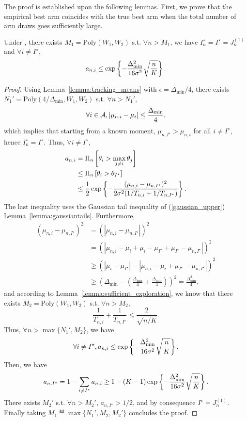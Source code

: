 The proof is established upon the following lemmas. First, we prove that the empirical best arm coincides with the true best arm when the total number of arm draws goes sufficiently large.

\begin{lemma}\label{lemma:empirical_best}
    Under \TTTS, there exists $M_1 = \text{Poly}(W_1,W_2)$ s.t. $\forall n > M_1$, we have $I_n^\star = I^\star = J_n^{(1)}$ and $\forall i \neq I^\star$,
    \[
        a_{n,i} \leq \exp\left\{-\frac{\Delta_{\text{min}}^2}{16\sigma^2}\sqrt{\frac{n}{K}}\right\}.
    \]
\end{lemma}

\begin{proof}
    Using Lemma~\ref{lemma:tracking_means} with $\epsilon = \Delta_{\min}/4$, there exists $N_1' = \text{Poly}(4/\Delta_{\min},W_1,W_2)$ s.t. $\forall n > N_1'$,
    \[
        \forall i\in\mathcal{A}, |\mu_{n,i} - \mu_i| \leq \frac{\Delta_{\min}}{4}, 
    \]
    which implies that starting from a known moment, $\mu_{n,I^\star} > \mu_{n,i}$ for all $i\neq I^\star$, hence $I_n^\star = I^\star$. Thus, $\forall i \neq I^\star$,
    \begin{align*}
        a_{n,i} &= \Pi_{n}\left[\theta_i > \max_{j\neq i} \theta_j\right]\\
                             &\leq \Pi_{n}\left[\theta_i > \theta_{I^\star}\right]\\
                             &\leq \frac{1}{2}\exp\left\{-\frac{(\mu_{n,i}-\mu_{n,I^\star})^2}{2\sigma^2(1/T_{n,i}+1/T_{n,I^\star})}\right\}.
    \end{align*}
    The last inequality uses the Gaussian tail inequality of (\ref{gaussian_upper}) Lemma~\ref{lemma:gaussiantails}. Furthermore,
    \begin{align*}
        (\mu_{n,i} - \mu_{n,I^\star})^2 &= (|\mu_{n,i} - \mu_{n,I^\star}|)^2\\
                                        &= (|\mu_{n,i} - \mu_i + \mu_i - \mu_{I^\star} + \mu_{I^\star} -\mu_{n,I^\star}|)^2\\
                                        &\geq (|\mu_i - \mu_{I^\star}| - |\mu_{n,i} - \mu_i + \mu_{I^\star} -\mu_{n,I^\star}|)^2\\
                                        &\geq \left(\Delta_{\text{min}} - \left(\frac{\Delta_{\text{min}}}{4} + \frac{\Delta_{\text{min}}}{4}\right)\right)^2 = \frac{\Delta_{\text{min}}^2}{4},
    \end{align*}
    and according to Lemma~\ref{lemma:sufficient_exploration}, we know that there exists $M_2 = \text{Poly}(W_1,W_2)$ s.t. $\forall n > M_2$,
    \[
        \frac{1}{T_{n,i}}+\frac{1}{T_{n,I^\star}} \leq \frac{2}{\sqrt{n/K}}.
    \]
    Thus, $\forall n > \max\{N_1',M_2\}$, we have
    \[
        \forall i\neq I^\star, a_{n,i} \leq \exp\left\{-\frac{\Delta_{\text{min}}^2}{16\sigma^2}\sqrt{\frac{n}{K}}\right\}.
    \]
    Then, we have
    \[
        a_{n,I^\star} = 1 - \sum_{i\neq I^\star} a_{n,i} \geq 1-(K-1)\exp\left\{-\frac{\Delta_{\text{min}}^2}{16\sigma^2}\sqrt{\frac{n}{K}}\right\}.
    \]
    There exists $M_2'$ s.t. $\forall n > M_2'$, $a_{n,I^\star}>1/2$, and by consequence $I^\star = J_n^{(1)}$. Finally taking $M_1 \eqdef \max\{N_1', M_2, M_2'\}$ concludes the proof.
\end{proof}

